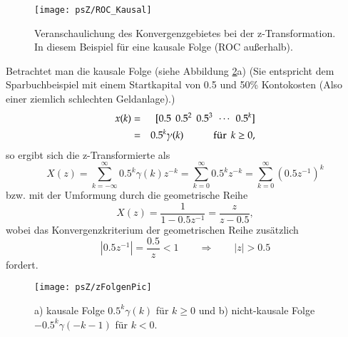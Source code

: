 \begin{figure}[H]
\begin{center}
\texttt{[image: psZ/ROC\_Kausal]}
\caption{\label{pic:ROC_Kausal} Veranschaulichung des Konvergenzgebietes
bei der z-Transformation. In diesem Beispiel für eine kausale Folge (ROC außerhalb).}
\end{center}
\end{figure}

\begin{example}
\label{Bsp:z_TrafoUndROC} Betrachtet man die kausale Folge (siehe Abbildung \ref{pic:zFolgnPic}a)
(Sie entspricht dem Sparbuchbeispiel mit einem Startkapital von
0.5 und 50\% Kontokosten (Also einer ziemlich schlechten Geldanlage).)
\begin{eqnarray} \label{eq:BspKausaleFolge}
    x(k) &=& [0.5 \:\: 0.5^2 \:\: 0.5^3 \:\: \cdots \:\: 0.5^k]\\
         & = & 0.5^k \gamma(k) \qquad \fuer k \geq 0 ,
\end{eqnarray}
so ergibt sich die z-Transformierte als
\begin{equation}
    X(z) = \sum_{k = -\infty}^{\infty} 0.5^k \gamma(k)z^{-k}
    = \sum_{k = 0}^{\infty} 0.5^k z^{-k} =
    \sum_{k = 0}^{\infty} (0.5z^{-1})^{k}
\end{equation}
bzw. mit der Umformung durch die geometrische Reihe
\begin{equation}
    X(z) = \frac{1}{1-0.5z^{-1}} = \frac{z}{z-0.5},
\end{equation}
wobei das Konvergenzkriterium der geometrischen Reihe zusätzlich
\begin{equation}\nonumber
    |0.5z^{-1}| = \frac{0.5}{z} < 1 \qquad \Rightarrow \qquad |z| > 0.5
\end{equation}
fordert.

\begin{figure}[H]
\begin{center}
\texttt{[image: psZ/zFolgenPic]}
\caption{\label{pic:zFolgnPic} a) kausale Folge $0.5^k \gamma(k)$ für $ k \geq 0 $
und b) nicht-kausale Folge $-0.5^k \gamma(-k-1)$ für $k < 0$.}
\end{center}
\end{figure}


\end{example}

